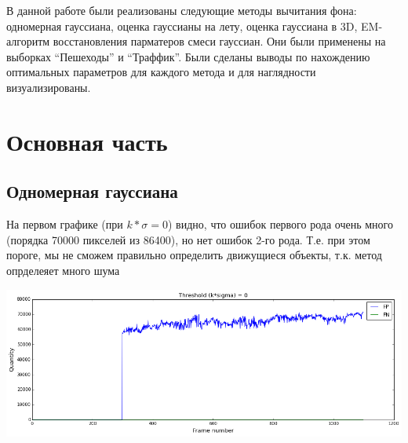 \documentclass[12pt, a4paper]{article}
\begin{document}
		В данной работе были реализованы следующие методы вычитания фона: одномерная гауссиана, оценка гауссианы на лету, оценка гауссиана в 3D, EM-алгоритм восстановления парматеров смеси гауссиан. Они были применены на выборках ``Пешеходы'' и ``Траффик''. Были сделаны выводы по нахождению оптимальных параметров для каждого метода и для наглядности визуализированы.

	\newpage
	\section{Основная часть}
		\subsection{Одномерная гауссиана}
			На первом графике (при $k * \sigma = 0$) видно, что ошибок первого рода очень много (порядка 70000 пикселей из 86400), но нет ошибок 2-го рода. Т.е. при этом пороге, мы не сможем правильно определить движущиеся объекты, т.к. метод опрделеяет много шума
			\begin{center}
				\includegraphics[width=17cm]{1par_k_0.png}
			\end{center}
\end{document}
